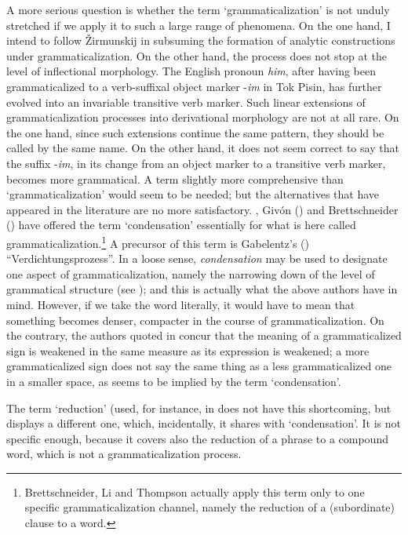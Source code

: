 A more serious question is whether the term ‘grammaticalization’ is not unduly stretched if we apply it to such a large range of phenomena. On the one hand, I intend to follow Žirmunskij in subsuming the formation of analytic constructions under grammaticalization. On the other hand, the process does not stop at the level of inflectional morphology. The English pronoun \textit{him}, after having been grammaticalized to a verb-suffixal object marker -\textit{im} in Tok Pisin, has further evolved into an invariable transitive verb marker. Such linear extensions of grammaticalization processes into derivational morphology are not at all rare. On the one hand, since such extensions continue the same pattern, they should be called by the same name. On the other hand, it does not seem correct to say that the suffix -\textit{im}, in its change from an object marker to a transitive verb marker, becomes more grammatical. A term slightly more comprehensive than ‘grammaticalization’ would seem to be needed; but the alternatives that have appeared in the literature are no more satisfactory. \citet{LiEtAL1974}, Givón (\citeyear[209]{Givón1979b}) and Brettschneider (\citeyear[94]{BrettschneiderEtAl1980})  have offered the term ‘condensation’ essentially for what is here called grammaticalization.\footnote{Brettschneider, Li and Thompson actually apply this term only to one specific grammaticalization channel, namely the reduction of a (subordinate) clause to a word.} A precursor of this term is Gabelentz's (\citeyear[433, 436]{Gabelentz1891}) ``Verdichtungsprozess''. In a loose sense, \textit{condensation} may be used to designate one aspect of grammaticalization, namely the narrowing down of the level of grammatical structure (see ); and this is actually what the above authors have in mind. However, if we take the word literally, it would have to mean that something becomes denser, compacter in the course of grammaticalization. On the contrary, the authors quoted in  concur that the meaning of a grammaticalized sign is weakened in the same measure as its expression is weakened; a more grammaticalized sign does not say the same thing as a less grammaticalized one in a smaller space, as seems to be implied by the term ‘condensation’.

The term ‘reduction’ (used, for instance, in \citep[103--107]{Langacker1977} does not have this shortcoming, but displays a different one, which, incidentally, it shares with ‘condensation’. It is not specific enough, because it covers also the reduction of a phrase to a compound word, which is not a grammaticalization process.

